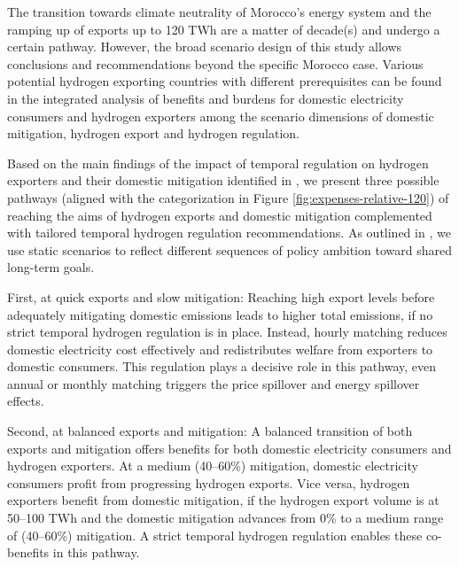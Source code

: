

The transition towards climate neutrality of Morocco's energy system and the ramping up of exports up to 120 TWh are a matter of decade(s) and undergo a certain pathway. 
However, the broad scenario design of this study allows conclusions and recommendations beyond the specific Morocco case.
Various potential hydrogen exporting countries with different prerequisites can be found in the integrated analysis of benefits and burdens for domestic electricity consumers and hydrogen exporters among the scenario dimensions of domestic \co mitigation, hydrogen export and hydrogen regulation.

Based on the main findings of the impact of temporal regulation on hydrogen exporters and their domestic \co mitigation identified in , we present three possible pathways (aligned with the categorization in Figure \ref{fig:expenses-relative-120}) of reaching the aims of hydrogen exports and domestic \co mitigation complemented with tailored temporal hydrogen regulation recommendations.
As outlined in , we use static scenarios to reflect different sequences of policy ambition toward shared long-term goals.

First, at quick exports and slow \co mitigation: Reaching high export levels before adequately mitigating domestic emissions leads to higher total emissions, if no strict temporal hydrogen regulation is in place. Instead, hourly matching reduces domestic electricity cost effectively and redistributes welfare from exporters to domestic consumers. This regulation plays a decisive role in this pathway, even annual or monthly matching triggers the price spillover and energy spillover effects.

Second, at balanced exports and \co mitigation: A balanced transition of both exports and mitigation offers benefits for both domestic electricity consumers and hydrogen exporters. At a medium (40--60\%) \co mitigation, domestic electricity consumers profit from progressing hydrogen exports. Vice versa, hydrogen exporters benefit from domestic \co mitigation, if the hydrogen export volume is at 50--100 TWh and the domestic \co mitigation advances from 0\% to a medium range of (40--60\%) \co mitigation. A strict temporal hydrogen regulation enables these co-benefits in this pathway.

